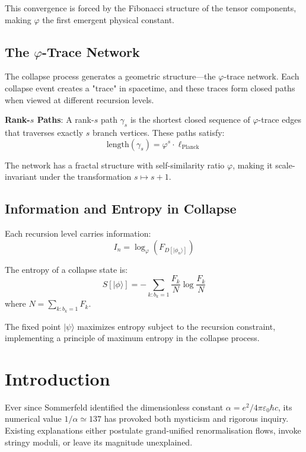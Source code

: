 \documentclass[%
 reprint,
 amsmath,amssymb,
 aps,
 prd,
 nofootinbib,      %
 longbibliography  %
]{revtex4-2}
\begin{document}
This convergence is forced by the Fibonacci structure of the tensor components, making $\varphi$ the first emergent physical constant.

\subsection{The $\varphi$-Trace Network}

The collapse process generates a geometric structure—the $\varphi$-trace network. Each collapse event creates a "trace" in spacetime, and these traces form closed paths when viewed at different recursion levels.

\textbf{Rank-$s$ Paths}: A rank-$s$ path $\gamma_s$ is the shortest closed sequence of $\varphi$-trace edges that traverses exactly $s$ branch vertices. These paths satisfy:
\begin{equation}
\text{length}(\gamma_s) = \varphi^s \cdot \ell_{\text{Planck}}
\end{equation}

The network has a fractal structure with self-similarity ratio $\varphi$, making it scale-invariant under the transformation $s \mapsto s+1$.

\subsection{Information and Entropy in Collapse}

Each recursion level carries information:
\begin{equation}
I_n = \log_\varphi(F_{D[|\phi_n\rangle]})
\end{equation}

The entropy of a collapse state is:
\begin{equation}
S[|\phi\rangle] = -\sum_{k: b_k=1} \frac{F_k}{N} \log \frac{F_k}{N}
\end{equation}
where $N = \sum_{k: b_k=1} F_k$.

The fixed point $|\psi\rangle$ maximizes entropy subject to the recursion constraint, implementing a principle of maximum entropy in the collapse process.

\section{Introduction}\label{sec:intro}

Ever since Sommerfeld identified the dimensionless constant
\(\alpha = e^2/4\pi\varepsilon_0\hbar c\),
its numerical value
\(1/\alpha \simeq 137\)
has provoked both mysticism and rigorous inquiry.
Existing explanations either
postulate grand-unified renormalisation flows,
invoke stringy moduli,
or leave its magnitude unexplained.
\end{document}
